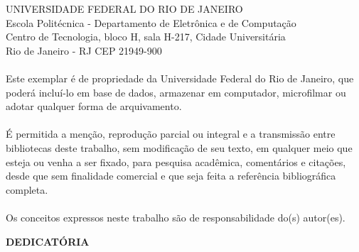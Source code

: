       \vspace{0.5cm}
      \begin{flushright}
         \parbox{10cm}{
            \hrulefill
            \vspace{-.375cm}
            \vspace{0.1cm}
         }
      \end{flushright}

\pagebreak

      \vspace{0.5cm}

UNIVERSIDADE FEDERAL DO RIO DE JANEIRO \\
Escola Polit\'ecnica - Departamento de Eletr\^onica e de Computa\c{c}\~ao \\
Centro de Tecnologia, bloco H, sala H-217, Cidade Universit\'aria \\
Rio de Janeiro - RJ \hspace{0.3cm} CEP 21949-900\\
\vspace{0.5cm}
\paragraph{}Este exemplar \'e de propriedade da Universidade Federal do Rio de Janeiro, que poder\'a inclu\'i-lo em base de dados, armazenar em computador, microfilmar ou adotar qualquer forma de arquivamento.
\paragraph{}\'E permitida a men\c{c}\~ao, reprodu\c{c}\~ao parcial ou integral e a transmiss\~ao entre bibliotecas deste trabalho, sem modifica\c{c}\~ao de seu texto, em qualquer meio que esteja ou venha a ser fixado, para pesquisa acad\^emica, coment\'arios e cita\c{c}\~oes, desde que sem finalidade comercial e que seja feita a refer\^encia bibliogr\'afica completa.
\paragraph{}Os conceitos expressos neste trabalho s\~ao de responsabilidade do(s) autor(es).

\pagebreak

\begin{center}
\textbf{DEDICAT\'ORIA}
\end{center}
      \vspace{0.5cm}

